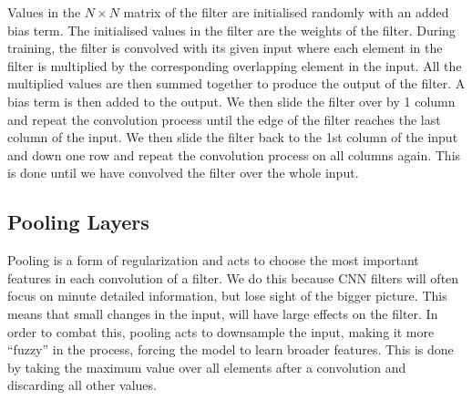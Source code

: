 Values in the $N \times N$ matrix of the filter are initialised 
randomly with an added bias term. The initialised values in the 
filter are the weights of the filter. During training, the filter is 
convolved with its given input where each element in the filter 
is multiplied by the corresponding overlapping element in the 
input. All the multiplied values are then summed together to produce 
the output of the filter. A bias term is then added to the 
output. We then slide the filter over by 1 column and repeat 
the convolution process until the edge of the filter reaches 
the last column of the input. We then slide the filter back to 
the 1st column of the input and down one row and repeat 
the convolution process on all columns again. This is done 
until we have convolved the filter over the whole input.

\subsection{Pooling Layers}
Pooling is a form of regularization and acts to choose 
the most important features in each convolution of a filter. 
We do this because \ac{CNN} filters will often focus 
on minute detailed information, but lose sight of the 
bigger picture. This means that small changes in the 
input, will have large effects on the filter. In order to 
combat this, pooling acts to downsample the input, making 
it more ``fuzzy'' in the process, forcing the model 
to learn broader features.
This is done by taking the maximum value over all elements 
after a convolution and discarding all other values. 


